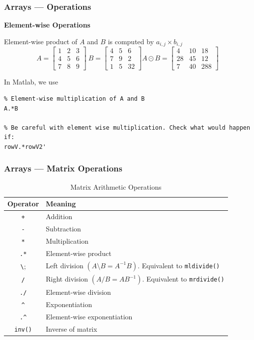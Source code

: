 \documentclass[11pt,xcolor={svgnames},aspectratio=169,usepdftitle=false]{beamer}
\let\toneitemize\itemize
\let\ttwoitemize\enditemize
\renewenvironment{itemize}{\toneitemize\addtolength{\itemsep}{1.35\baselineskip}}{\ttwoitemize}
\begin{document}
\begin{frame}[fragile]
    \frametitle{Arrays --- Operations}
    \alert{\textbf{Element-wise Operations}}
\begin{itemize}
    \item Element-wise product of $A$ and $B$ is computed by $a_{i,j}\times b_{i,j}$
    \[
    A = \begin{bmatrix}
        1 & 2 & 3 \\
        4 & 5 & 6 \\
        7 & 8 & 9 
        \end{bmatrix} \ 
    B = \begin{bmatrix}
        4 & 5 & 6 \\
        7 & 9 & 2 \\
        1 & 5 & 32
        \end{bmatrix}
    A \odot B = 
    \begin{bmatrix}
        4  &  10 &   18 \\
        28  &  45 &   12 \\
        7  &  40 &  288
    \end{bmatrix}    
    \]
    \item In Matlab, we use
\begin{lstlisting}
% Element-wise multiplication of A and B
A.*B
    
% Be careful with element wise multiplication. Check what would happen if:
rowV.*rowV2'
\end{lstlisting}
\end{itemize}
\end{frame}

\begin{frame}[fragile]
    \frametitle{Arrays --- Matrix Operations}
    \begin{table}[htbp]
        \caption{Matrix Arithmetic Operations}
        \label{tab:matrix_operators}
        \begin{tabular}{@{}cl@{}}
        \toprule
        Operator & Meaning \\ \midrule
        \verb;+;  & Addition \\ 
        \verb;-;  & Subtraction \\ 
        \verb;*;  & Multiplication \\ 
        \verb;.*; & Element-wise product \\
        \verb;\;  & Left division $(A \setminus B = A^{-1}B)$. Equivalent to \verb;mldivide(); \\
        \verb;/;  & Right division $(A / B = AB^{-1})$. Equivalent to \verb;mrdivide(); \\
        \verb;./; & Element-wise division \\ 
        \verb;^;  & Exponentiation \\
        \verb;.^;  & Element-wise exponentiation \\
        \verb;inv(); & Inverse of matrix \\ \bottomrule
        \end{tabular}
    \end{table}
\end{frame}
\end{document}
